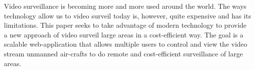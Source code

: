 Video surveillance is becoming more and more used around the world.
The ways technology allow us to video surveil today is, however, quite expensive and has its limitations.
This paper seeks to take advantage of modern technology to provide a new approach of video surveil large areas in a cost-efficient way. 
The goal is a scalable web-application that allows multiple users to control and view the video stream unmanned air-crafts to do remote and cost-efficient surveillance of large areas.